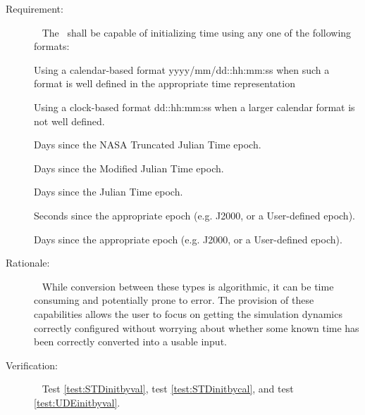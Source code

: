\label{reqt:timeinitializationbyformat}
\begin{description}
  \item[Requirement:]\ \newline
    The \timeDesc\ shall be capable of initializing 
    time using any one of the following formats:

		\label{reqt:func_time_initialization_format_cal} \newline
		Using a calendar-based format yyyy/mm/dd::hh:mm:ss when such a 
		format is well defined in the appropriate time representation

		\label{reqt:func_time_initialization_format_clock} \newline
		Using a clock-based format dd::hh:mm:ss when a larger calendar 
		format is not well defined.

		\label{reqt:func_time_initialization_format_tjt} \newline
		Days since the NASA Truncated Julian Time epoch.

		\label{reqt:func_time_initialization_format_mjt} \newline
		Days since the Modified Julian Time epoch.

		\label{reqt:func_time_initialization_format_jt} \newline
		Days since the Julian Time epoch.

		\label{reqt:func_time_initialization_format_s2k} \newline
		Seconds since the appropriate epoch (e.g. J2000, or a 
		User-defined epoch).
		
		\label{reqt:func_time_initialization_format_dUDE} \newline
		Days since the appropriate epoch (e.g. J2000, or a User-defined 
		epoch).
		
  \item[Rationale:]\ \newline
    While conversion between these types is algorithmic, it can be time 
    consuming and
		potentially prone to error.  The provision of these 
		capabilities allows the
		user to focus on getting the simulation dynamics correctly 
		configured without worrying about
		whether some known time has been correctly converted into a 
		usable input.

  \item[Verification:]\ \newline
    Test \vref{test:STDinitbyval}, test \vref{test:STDinitbycal}, and test 
    \vref{test:UDEinitbyval}.
\end{description}


